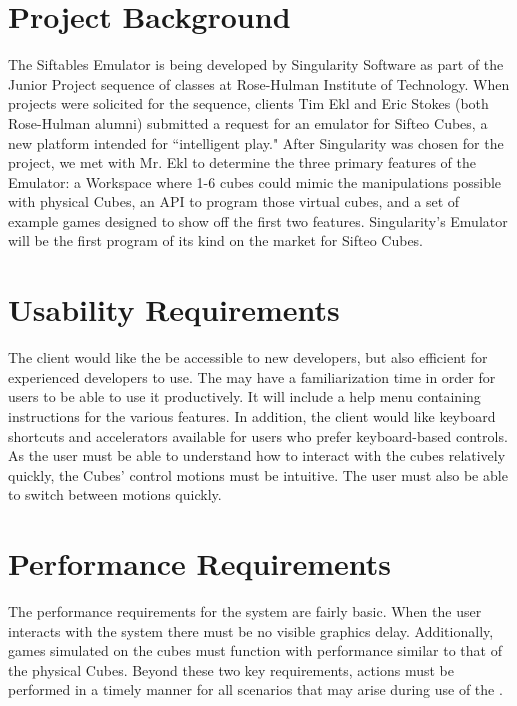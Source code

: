 \documentclass[12pt]{article}
\begin{document}
\section{Project Background}
The Siftables Emulator is being developed by Singularity Software as part of the Junior Project sequence of classes at Rose-Hulman Institute of Technology. When projects were solicited for the sequence, clients Tim Ekl and Eric Stokes (both Rose-Hulman alumni) submitted a request for an emulator for Sifteo Cubes, a new platform intended for ``intelligent play." After Singularity was chosen for the project, we met with Mr. Ekl to determine the three primary features of the Emulator: a Workspace where 1-6 cubes could mimic the manipulations possible with physical Cubes, an \gls{API} to program those virtual cubes, and a set of example games designed to show off the first two features. Singularity's Emulator will be the first program of its kind on the market for Sifteo Cubes.

\section{Usability Requirements}
The client would like the  be accessible to new developers, but also efficient for experienced developers to use. The  may have a familiarization time in order for users to be able to use it productively. It will include a help menu containing instructions for the various features. In addition, the client would like keyboard shortcuts and accelerators available for users who prefer keyboard-based controls. As the user must be able to understand how to interact with the cubes relatively quickly, the Cubes' control motions must be intuitive. The user must also be able to switch between motions quickly.

\section{Performance Requirements}
The performance requirements for the system are fairly basic. When the user interacts with the system there must be no visible graphics delay. Additionally, games simulated on the cubes must function with performance similar to that of the physical Cubes. Beyond these two key requirements, actions must be performed in a timely manner for all scenarios that may arise during use of the .
\end{document}
